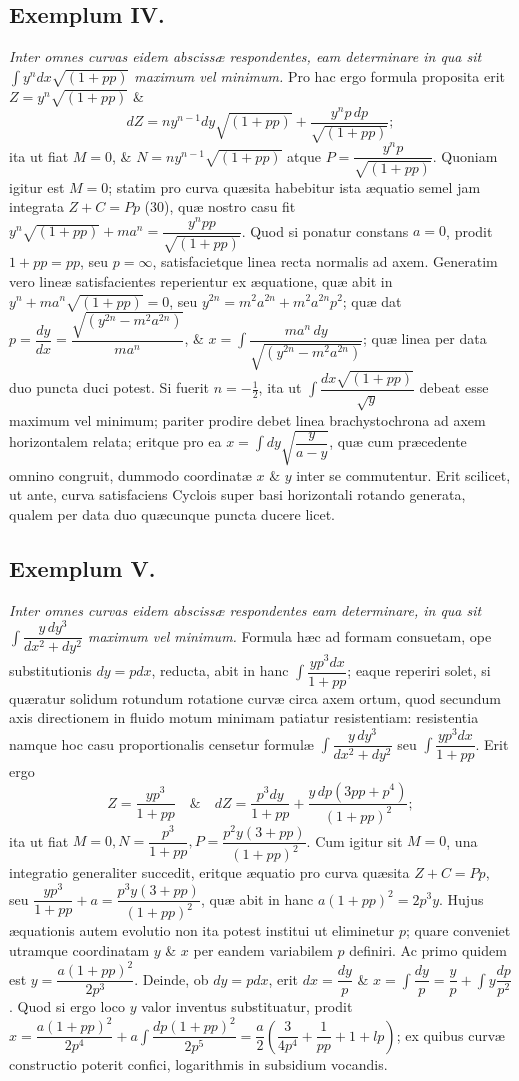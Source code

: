 \subsection*{Exemplum IV.}
\textit{Inter omnes curvas eidem abscissæ respondentes, eam determinare in qua sit $\int y^n dx\sqrt{(1+pp)}$ maximum vel minimum.}
Pro hac ergo formula proposita erit $Z=y^n\sqrt{(1+pp)}$ \&\[dZ=ny^{n-1}dy\sqrt{(1+pp)}+\dfrac{y^n p\,dp}{\sqrt{(1+pp)}};\] ita ut fiat $M=0$, \& $N=ny^{n-1}\sqrt{(1+pp)}$ atque $P=\dfrac{y^np}{\sqrt{(1+pp)}}$. Quoniam igitur est $M=0$; statim pro curva quæsita habebitur ista æquatio semel jam integrata $Z+C=Pp$ (30), quæ nostro casu fit $y^n\sqrt{(1+pp)}+ma^n=\dfrac{y^npp}{\sqrt{(1+pp)}}$. Quod si ponatur constans $a=0$, prodit $1+pp=pp$, seu $p=\infty$, satisfacietque linea recta normalis ad axem. Generatim vero lineæ satisfacientes reperientur ex æquatione, quæ abit in $y^n+ma^n\sqrt{(1+pp)}=0$, seu $y^{2n}=m^2a^{2n}+m^2a^{2n}p^2$; quæ dat $p=\dfrac{dy}{dx}=\dfrac{\sqrt{(y^{2n}-m^2a^{2n})}}{ma^n}$, \& $x=\int\dfrac{ma^n\,dy}{\sqrt{(y^{2n}-m^2a^{2n})}}$; quæ linea per data duo puncta duci potest. Si fuerit $n=-\frac12$, ita ut $\int\dfrac{dx\sqrt{(1+pp)}}{\sqrt y}$ debeat esse maximum vel minimum; pariter prodire debet linea brachystochrona ad axem horizontalem relata; eritque pro ea $x=\int dy\sqrt{\dfrac y{a-y}}$, quæ cum præcedente omnino congruit, dummodo coordinatæ $x$ \& $y$ inter se commutentur. Erit scilicet, ut ante, curva satisfaciens Cyclois super basi horizontali rotando generata, qualem per data duo quæcunque puncta ducere licet.

\subsection*{Exemplum V.}
 \textit{Inter omnes curvas eidem abscissæ respondentes eam determinare, in qua sit $\int\dfrac{y\,dy^3}{dx^2+dy^2}$ maximum vel minimum.}
Formula hæc ad formam consuetam, ope substitutionis $dy=pdx$, reducta, abit in hanc $\int\dfrac{yp^3dx}{1+pp}$; eaque reperiri solet, si quæratur solidum rotundum rotatione curvæ circa axem ortum, quod secundum axis directionem in fluido motum minimam patiatur resistentiam: resistentia namque hoc casu proportionalis censetur formulæ $\int\dfrac{y\,dy^3}{dx^2+dy^2}$ seu $\int\dfrac{yp^3dx}{1+pp}$. Erit ergo
\[
Z=\frac{yp^3}{1+pp}\quad\&\quad dZ=\frac{p^3dy}{1+pp}+\frac{y\,dp(3pp+p^4)}{(1+pp)^2};
\]
ita ut fiat $M=0,N=\dfrac{p^3}{1+pp},P=\dfrac{p^2y(3+pp)}{(1+pp)^2}$. Cum igitur sit $M=0$, una integratio generaliter succedit, eritque æquatio pro curva quæsita $Z+C=Pp$, seu $\dfrac{yp^3}{1+pp}+a=\dfrac{p^3y(3+pp)}{(1+pp)^2}$, quæ abit in hanc $a(1+pp)^2=2p^3y$. Hujus æquationis autem evolutio non ita potest institui ut eliminetur $p$; quare conveniet utramque coordinatam $y$ \& $x$ per eandem variabilem $p$ definiri. Ac primo quidem est $y=\dfrac{a(1+pp)^2}{2p^3}$. Deinde, ob $dy=pdx$, erit $dx=\dfrac{dy}{p}$ \& $x=\int\dfrac{dy}{p}=\dfrac{y}{p}+\int y\dfrac{dp}{p^2}$. Quod si ergo loco $y$ valor inventus substituatur, prodit $x=\dfrac{a(1+pp)^2}{2p^4}+a\int\dfrac{dp(1+pp)^2}{2p^5}=\dfrac a2\left(\dfrac3{4p^4}+\dfrac1{pp}+1+lp\right)$; ex quibus curvæ constructio poterit confici, logarithmis in subsidium vocandis.

